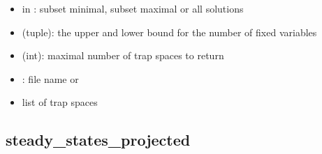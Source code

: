 \documentclass[letterpaper,10pt,english]{sphinxmanual}
\begin{document}
\begin{fulllineitems}
\begin{description}
\begin{itemize}
\item {} 
 in : subset minimal, subset maximal or all solutions

\item {} 
 (tuple): the upper and lower bound for the number of fixed variables

\item {} 
 (int): maximal number of trap spaces to return

\item {} 
: file name or 

\end{itemize}

\item[{\sphinxstylestrong{returns}:}] \leavevmode\begin{itemize}
\item {} 
list of trap spaces

\end{itemize}

\item[{\sphinxstylestrong{example}::}] \leavevmode
\begin{sphinxVerbatim}[commandchars=\\\{\}]
    
\PYG{p}{[}\PYG{p}{]}
\end{sphinxVerbatim}

\end{description}

\end{fulllineitems}



\subsection{steady\_states\_projected}
\label{\detokenize{AspSolver:steady-states-projected}}\label{\detokenize{AspSolver:id7}}
\end{document}
